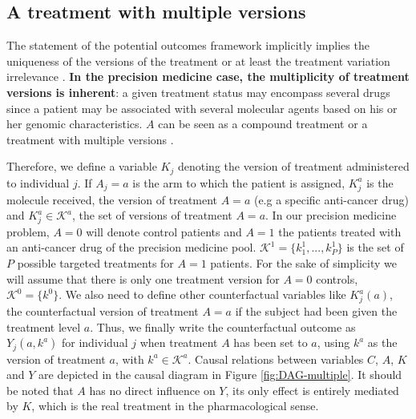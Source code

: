 \documentclass[a4paper,12pt,twoside,onecolumn,openright,final,oldfontcommands]{memoir}
\begin{document}
\subsection{A treatment with multiple
versions}\label{a-treatment-with-multiple-versions}

The statement of the potential outcomes framework implicitly implies the
uniqueness of the versions of the treatment
\citep{rubin1980randomization} or at least the treatment variation
irrelevance \citep{vanderweele2009concerning}. \textbf{In the precision
medicine case, the multiplicity of treatment versions is inherent}: a
given treatment status may encompass several drugs since a patient may
be associated with several molecular agents based on his or her genomic
characteristics. \(A\) can be seen as a compound treatment
\citep{hernan2011compound} or a treatment with multiple versions
\citep{vanderweele2013causal}.

Therefore, we define a variable \(K_j\) denoting the version of
treatment administered to individual \(j\). If \(A_j=a\) is the arm to
which the patient is assigned, \(K^a_j\) is the molecule received, the
version of treatment \(A=a\) (e.g a specific anti-cancer drug) and
\(K^a_j \in \mathcal{K}^a\), the set of versions of treatment \(A=a\).
In our precision medicine problem, \(A=0\) will denote control patients
and \(A=1\) the patients treated with an anti-cancer drug of the
precision medicine pool. \(\mathcal{K}^1=\{k^1_1, ..., k^1_P\}\) is the
set of \(P\) possible targeted treatments for \(A=1\) patients. For the
sake of simplicity we will assume that there is only one treatment
version for \(A=0\) controls, \(\mathcal{K}^0=\{k^0\}\). We also need to
define other counterfactual variables like \(K^a_j(a)\), the
counterfactual version of treatment \(A=a\) if the subject had been
given the treatment level \(a\). Thus, we finally write the
counterfactual outcome as \(Y_j(a,k^a)\) for individual \(j\) when
treatment \(A\) has been set to \(a\), using \(k^a\) as the version of
treatment \(a\), with \(k^a \in \mathcal{K}^a\). Causal relations
between variables \(C\), \(A\), \(K\) and \(Y\) are depicted in the
causal diagram in Figure \ref{fig:DAG-multiple}. It should be noted that
\(A\) has no direct influence on \(Y\), its only effect is entirely
mediated by \(K\), which is the real treatment in the pharmacological
sense.
\end{document}
